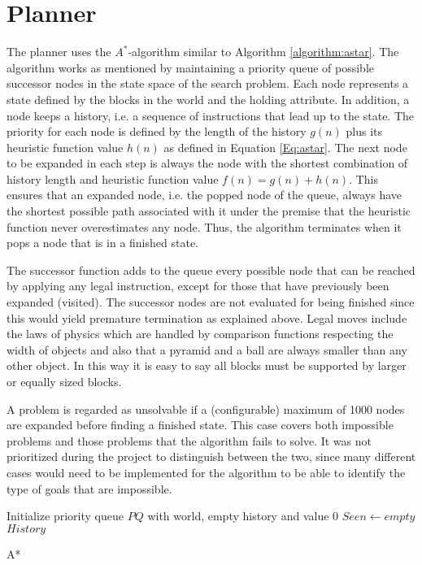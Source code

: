 \section{Planner} 

The planner uses the $A^*$-algorithm similar to Algorithm \ref{algorithm:astar}.
The algorithm works as mentioned by maintaining a priority queue of possible
successor nodes in the state space of the search problem. Each node represents a
state defined by the blocks in the world and the holding attribute. In addition,
a node keeps a history, i.e. a sequence of instructions that lead up to the
state. The priority for each node is defined by the length of the history $g(n)$
plus its heuristic function value $h(n)$ as defined in Equation \ref{Eq:astar}.
The next node to be expanded in each step is always the node with the shortest
combination of history length and heuristic function value $f(n) = g(n) + h(n)$.
This ensures that an expanded node, i.e. the popped node of the queue, always
have the shortest possible path associated with it under the premise that the
heuristic function never overestimates any node. Thus, the algorithm terminates
when it pops a node that is in a finished state. 

The successor function adds to the queue every possible node that can be reached
by applying any legal instruction, except for those that have previously been
expanded (visited). The successor nodes are not evaluated for being finished
since this would yield premature termination as explained above. Legal moves
include the laws of physics which are handled by comparison functions respecting
the width of objects and also that a pyramid and a ball are always smaller than
any other object. In this way it is easy to say all blocks must be supported by
larger or equally sized blocks.

A problem is regarded as unsolvable if a (configurable) maximum of 1000 nodes
are expanded before finding a finished state. This case covers both impossible
problems and those problems that the algorithm fails to solve. It was not
prioritized during the project to distinguish between the two, since many
different cases would need to be implemented for the algorithm to be able to
identify the type of goals that are impossible. 

\begin{algorithm}[h!]
 \SetAlgoLined
 Initialize priority queue $PQ$ with world, empty history and value 0\;
 $Seen \leftarrow empty$\;
 \Return $History$
 \caption{A*}
 \label{algorithm:astar}
\end{algorithm} 


